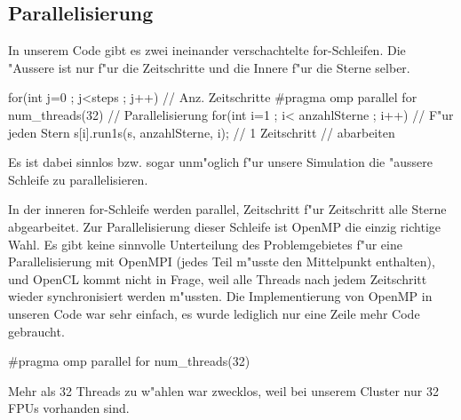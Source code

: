 \begin{refsection}
	\subsection{Parallelisierung}
	In unserem Code gibt es zwei ineinander verschachtelte for-Schleifen. Die "Aussere ist nur f"ur die Zeitschritte und die Innere f"ur die Sterne selber.
\begin{Cpp}
for(int j=0 ; j<steps ; j++){              // Anz. Zeitschritte
  #pragma omp parallel for num_threads(32) // Parallelisierung
  for(int i=1 ; i< anzahlSterne ; i++) {   // F"ur jeden Stern
    s[i].run1s(s, anzahlSterne, i);		   // 1 Zeitschritt
  }										   // abarbeiten	
}
\end{Cpp}
    Es ist dabei sinnlos bzw. sogar unm"oglich f"ur unsere Simulation die "aussere Schleife zu parallelisieren.
    
	In der inneren for-Schleife werden parallel, Zeitschritt f"ur Zeitschritt alle Sterne abgearbeitet. Zur Parallelisierung dieser Schleife ist OpenMP die einzig richtige Wahl. Es gibt keine sinnvolle Unterteilung des Problemgebietes f"ur eine Parallelisierung mit OpenMPI (jedes Teil m"usste den Mittelpunkt enthalten), und OpenCL kommt nicht in Frage, weil alle Threads nach jedem Zeitschritt wieder synchronisiert werden m"ussten.
	Die Implementierung von OpenMP in unseren Code war sehr einfach, es wurde lediglich nur eine Zeile mehr Code gebraucht. 
\begin{Cpp}
#pragma omp parallel for num_threads(32)
\end{Cpp}
	Mehr als 32 Threads zu w"ahlen war zwecklos, weil bei unserem Cluster nur 32 FPUs vorhanden sind.
    

\end{refsection}
